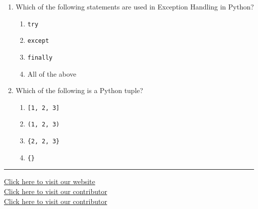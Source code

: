 \documentclass[11pt,a4paper]{article}
\begin{document}
\begin{enumerate}[label=(\roman*),leftmargin=*,itemsep=8pt]
  \item Which of the following statements are used in Exception Handling in Python?
  
\begin{enumerate}[label=(\alph*),itemsep=2pt]
    \item   \texttt{try}
    \item   \texttt{except}
    \item   \texttt{finally}
    \item All of the above
  \end{enumerate}

  \item Which of the following is a Python tuple?
  
\begin{enumerate}[label=(\alph*),itemsep=2pt]
    \item   \texttt{[1, 2, 3]}
    \item   \texttt{(1, 2, 3)}
    \item   \texttt{\{2, 2, 3\}}
    \item   \texttt{\{\}}
  \end{enumerate}

\end{enumerate}

\vfill
\rule{\linewidth}{0.4pt}

\begin{center}\small
\href{https://bhu-exam.vercel.app/}{Click here to visit our website}\\[4pt]\href{https://me-aryan.vercel.app/}{Click here to visit our contributor}\\[4pt]\href{https://quashan-me.vercel.app/}{Click here to visit our contributor}
\end{center}
\end{document}
